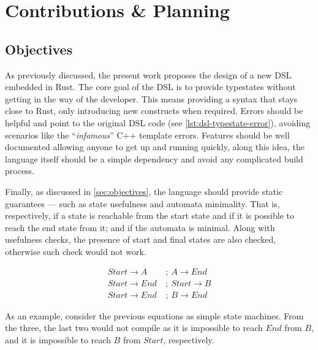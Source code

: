 \chapter{Contributions \& Planning}\label{cha:planning}


\section{Objectives}

As previously discussed, the present work proposes the design of a new DSL embedded in Rust.
The core goal of the DSL is to provide typestates without getting in the way of the developer.
This means providing a syntax that stays close to Rust, only introducing new constructs when required.
Errors should be helpful and point to the original DSL code (see \autoref{lst:dsl-typestate-error}), avoiding scenarios like the “\emph{infamous}” C++ template errors.
Features should be well documented allowing anyone to get up and running quickly,
along this idea, the language itself should be a simple dependency and avoid any complicated build process.

Finally, as discussed in \autoref{sec:objectives}, the language should provide static guarantees ---
such as state usefulness and automata minimality.
That is, respectively, if a state is reachable from the start state and if it is possible to reach the end state from it;
and if the automata is minimal.
Along with usefulness checks, the presence of start and final states are also checked,
otherwise such check would not work.

\begin{align}
    Start \rightarrow A~   & ;~A \rightarrow End   \\
    Start \rightarrow End~ & ;~Start \rightarrow B \\
    Start \rightarrow End~ & ;~B \rightarrow End
\end{align}

As an example, consider the previous equations as simple state machines.
From the three, the last two would not compile as it is impossible to reach $End$ from $B$, and it is impossible to reach $B$ from $Start$, respectively.

